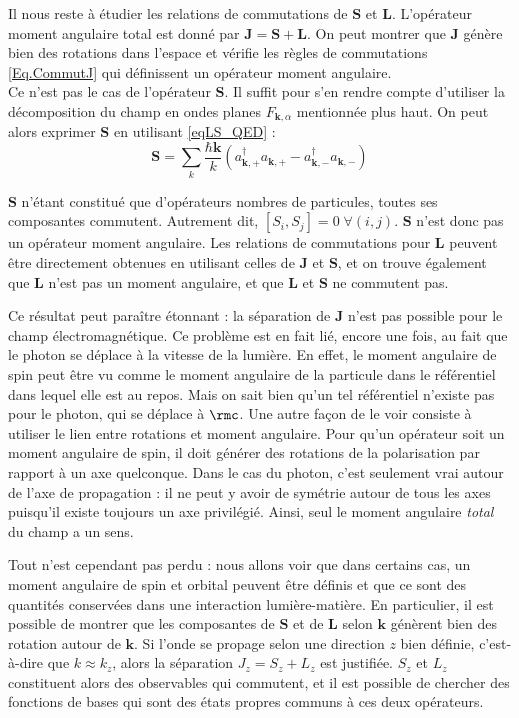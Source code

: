Il nous reste à étudier les relations de commutations de $\bm{S}$ et $\bm{L}$. L'opérateur moment angulaire total est donné par $\bm{J} = \bm{S}+\bm{L}$. On peut montrer  que $\bm{J}$ génère bien des rotations dans l'espace et vérifie les règles de commutations \ref{Eq.CommutJ} qui définissent un opérateur moment angulaire.\\
Ce n'est pas le cas de l'opérateur $\bm{S}$. Il suffit pour s'en rendre compte d'utiliser la décomposition du champ en ondes planes $F_{\bm{k},\alpha}$ mentionnée plus haut. On peut alors exprimer $\bm{S}$ en utilisant \ref{eqLS_QED} :
\begin{equation}
\bm{S} = \sum_k{\frac{\hbar\bm{k}}{k}(a^{\dag}_{\bm{k},+}a_{\bm{k},+}-a^{\dag}_{\bm{k},-}a_{\bm{k},-})}
\label{eqS_planewave}
\end{equation}

$\bm{S}$ n'étant constitué que d'opérateurs nombres de particules, toutes ses composantes commutent. Autrement dit, $[S_i,S_j] = 0 \;\forall(i,j)$. $\bm{S}$ n'est donc pas un opérateur moment angulaire. Les relations de commutations pour $\bm{L}$ peuvent être directement obtenues en utilisant celles de $\bm{J}$ et $\bm{S}$, et on trouve également que $\bm{L}$ n'est pas un moment angulaire, et que $\bm{L}$ et $\bm{S}$ ne commutent pas. 

Ce résultat peut paraître étonnant : la séparation de $\bm{J}$ n'est pas possible pour le champ électromagnétique. Ce problème est en fait lié, encore une fois, au fait que le photon se déplace à la vitesse de la lumière. En effet, le moment angulaire de spin peut être vu comme le moment angulaire de la particule dans le référentiel dans lequel elle est au repos. Mais on sait bien qu'un tel référentiel n'existe pas pour le photon, qui se déplace à $\rmc$. Une autre façon de le voir consiste à utiliser le lien entre rotations et moment angulaire. Pour qu'un opérateur soit un moment angulaire de spin, il doit générer des rotations de la polarisation par rapport à un axe quelconque. Dans le cas du photon, c'est seulement vrai autour de l'axe de propagation : il ne peut y avoir de symétrie autour de tous les axes puisqu'il existe toujours un axe privilégié. Ainsi, seul le moment angulaire \textit{total} du champ a un sens.

Tout n'est cependant pas perdu : nous allons voir que dans certains cas, un moment angulaire de spin et orbital peuvent être définis et que ce sont des quantités conservées dans une interaction lumière-matière. En particulier, il est possible de montrer  que les composantes de $\bm{S}$ et de $\bm{L}$ selon $\bm{k}$ génèrent bien des rotation autour de $\bm{k}$. Si l'onde se propage selon une direction $z$ bien définie, c'est-à-dire que $k\approx k_z$, alors la séparation $J_z = S_z + L_z$ est justifiée. $S_z$ et $L_z$ constituent alors des observables qui commutent, et il est possible de chercher des fonctions de bases qui sont des états propres communs à ces deux opérateurs.

